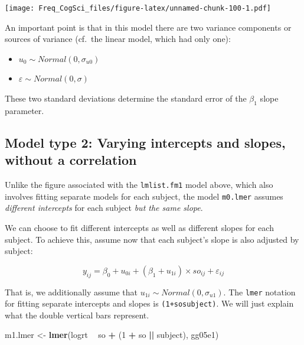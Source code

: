 \documentclass[12pt,]{krantz}
\newenvironment{Shaded}{\begin{snugshade}}{\end{snugshade}}
\newcommand{\DecValTok}[1]{\textcolor[rgb]{0.00,0.00,0.81}{#1}}
\newcommand{\KeywordTok}[1]{\textcolor[rgb]{0.13,0.29,0.53}{\textbf{#1}}}
\newcommand{\NormalTok}[1]{#1}
\newcommand{\OperatorTok}[1]{\textcolor[rgb]{0.81,0.36,0.00}{\textbf{#1}}}
\newcommand{\StringTok}[1]{\textcolor[rgb]{0.31,0.60,0.02}{#1}}
\providecommand{\tightlist}{%
  \setlength{\itemsep}{0pt}\setlength{\parskip}{0pt}}
\begin{document}
\texttt{[image: Freq\_CogSci\_files/figure-latex/unnamed-chunk-100-1.pdf]}

An important point is that in this model there are two variance components or sources of variance (cf.~the linear model, which had only one):

\begin{itemize}
\tightlist
\item
  \(u_0 \sim Normal(0,\sigma_{u0})\)
\item
  \(\varepsilon \sim Normal(0,\sigma)\)
\end{itemize}

These two standard deviations determine the standard error of the \(\beta_1\) slope parameter.

\hypertarget{model-type-2-varying-intercepts-and-slopes-without-a-correlation}{%
\subsection{Model type 2: Varying intercepts and slopes, without a correlation}\label{model-type-2-varying-intercepts-and-slopes-without-a-correlation}}

Unlike the figure associated with the \texttt{lmlist.fm1} model above, which also involves fitting separate models for each subject, the model \texttt{m0.lmer} assumes \emph{different intercepts} for each subject \emph{but the same slope}.

We can choose to fit different intercepts as well as different slopes for each subject. To achieve this, assume now that each subject's slope is also adjusted by subject:

\begin{equation}
y_{ij} = \beta_0 + u_{0i}+(\beta_1+u_{1i})\times so_{ij} + \varepsilon_{ij}
\end{equation}

That is, we additionally assume that \(u_{1i} \sim Normal(0,\sigma_{u1})\). The \texttt{lmer} notation for fitting separate intercepts and slopes is \texttt{(1+so\textbar{}\textbar{}subject)}. We will just explain what the double vertical bars represent.

\begin{Shaded}
\begin{Highlighting}[]
\NormalTok{m1.lmer <-}\StringTok{ }\KeywordTok{lmer}\NormalTok{(logrt }\OperatorTok{~}\StringTok{ }\NormalTok{so }\OperatorTok{+}\StringTok{ }\NormalTok{(}\DecValTok{1} \OperatorTok{+}\StringTok{ }\NormalTok{so }\OperatorTok{||}\StringTok{ }\NormalTok{subject), gg05e1)}
\end{Highlighting}
\end{Shaded}
\end{document}
